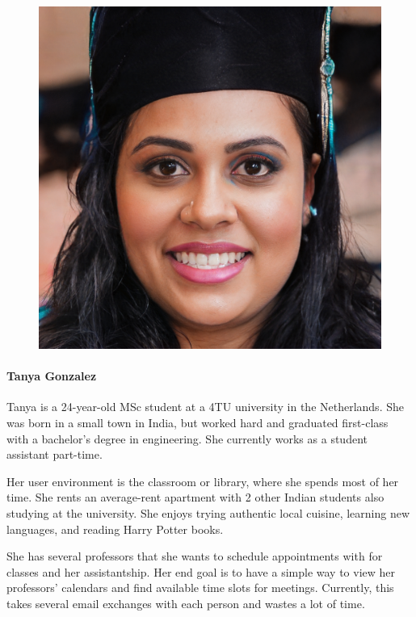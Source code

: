 \documentclass{article}
\begin{document}
\begin{figure}
	\includegraphics[scale=0.11]{persona-tanya.jpg}
\end{figure}

\paragraph{Tanya Gonzalez}

Tanya is a 24-year-old MSc student at a 4TU university in the Netherlands. She was born in a small town in India, but worked hard and graduated first-class with a bachelor's degree in engineering. She currently works as a student assistant part-time.

Her user environment is the classroom or library, where she spends most of her time. She rents an average-rent apartment with 2 other Indian students also studying at the university. She enjoys trying authentic local cuisine, learning new languages, and reading Harry Potter books.

She has several professors that she wants to schedule appointments with for classes and her assistantship. Her end goal is to have a simple way to view her professors' calendars and find available time slots for meetings. Currently, this takes several email exchanges with each person and wastes a lot of time.
\end{document}
